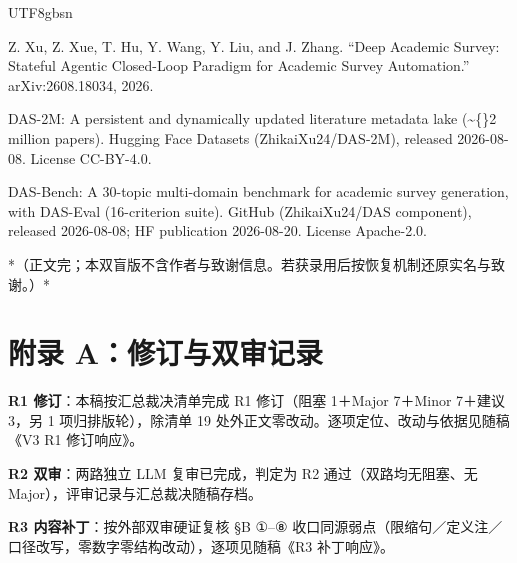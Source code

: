 \documentclass[10pt,a4paper]{article}
\begin{document}
\begin{CJK}{UTF8}{gbsn}
\begin{list}{}
\item [{[42]}] Z. Xu, Z. Xue, T. Hu, Y. Wang, Y. Liu, and J. Zhang. ``Deep Academic Survey: Stateful Agentic Closed-Loop Paradigm for Academic Survey Automation.'' arXiv:2608.18034, 2026.
\item [{[43]}] DAS-2M: A persistent and dynamically updated literature metadata lake (\textasciitilde\{\}2 million papers). Hugging Face Datasets (ZhikaiXu24/DAS-2M), released 2026-08-08. License CC-BY-4.0.
\item [{[44]}] DAS-Bench: A 30-topic multi-domain benchmark for academic survey generation, with DAS-Eval (16-criterion suite). GitHub (ZhikaiXu24/DAS component), released 2026-08-08; HF publication 2026-08-20. License Apache-2.0.
\end{list}

*（正文完；本双盲版不含作者与致谢信息。若获录用后按恢复机制还原实名与致谢。）*


\section*{附录 A：修订与双审记录}\textbf{R1 修订}：本稿按汇总裁决清单完成 R1 修订（阻塞 1＋Major 7＋Minor 7＋建议 3，另 1 项归排版轮），除清单 19 处外正文零改动。逐项定位、改动与依据见随稿《V3 R1 修订响应》。

\textbf{R2 双审}：两路独立 LLM 复审已完成，判定为 R2 通过（双路均无阻塞、无 Major），评审记录与汇总裁决随稿存档。

\textbf{R3 内容补丁}：按外部双审硬证复核 §B ①–⑧ 收口同源弱点（限缩句／定义注／口径改写，零数字零结构改动），逐项见随稿《R3 补丁响应》。


\end{CJK}
\end{document}
